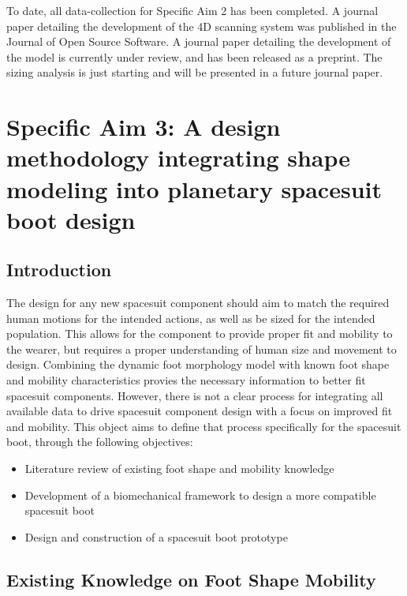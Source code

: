 \documentclass[defaultstyle,11pt]{comps}
\providecommand{\tightlist}{%
  \setlength{\itemsep}{0pt}\setlength{\parskip}{0pt}}
\begin{document}
To date, all data-collection for Specific Aim 2 has been completed.
A journal paper detailing the development of the 4D scanning system was published in the Journal of Open Source Software.
A journal paper detailing the development of the model is currently under review, and has been released as a preprint.
The sizing analysis is just starting and will be presented in a future journal paper.

\hypertarget{specific-aim-3-a-design-methodology-integrating-shape-modeling-into-planetary-spacesuit-boot-design}{%
\chapter{Specific Aim 3: A design methodology integrating shape modeling into planetary spacesuit boot design}\label{specific-aim-3-a-design-methodology-integrating-shape-modeling-into-planetary-spacesuit-boot-design}}

\hypertarget{introduction-2}{%
\section{Introduction}\label{introduction-2}}

The design for any new spacesuit component should aim to match the required human motions for the intended actions, as well as be sized for the intended population.
This allows for the component to provide proper fit and mobility to the wearer, but requires a proper understanding of human size and movement to design.
Combining the dynamic foot morphology model with known foot shape and mobility characteristics provies the necessary information to better fit spacesuit components.
However, there is not a clear process for integrating all available data to drive spacesuit component design with a focus on improved fit and mobility.
This object aims to define that process specifically for the spacesuit boot, through the following objectives:

\begin{itemize}
\tightlist
\item
  Literature review of existing foot shape and mobility knowledge
\item
  Development of a biomechanical framework to design a more compatible spacesuit boot
\item
  Design and construction of a spacesuit boot prototype
\end{itemize}

\hypertarget{existing-knowledge-on-foot-shape-mobility}{%
\section{Existing Knowledge on Foot Shape Mobility}\label{existing-knowledge-on-foot-shape-mobility}}
\end{document}
